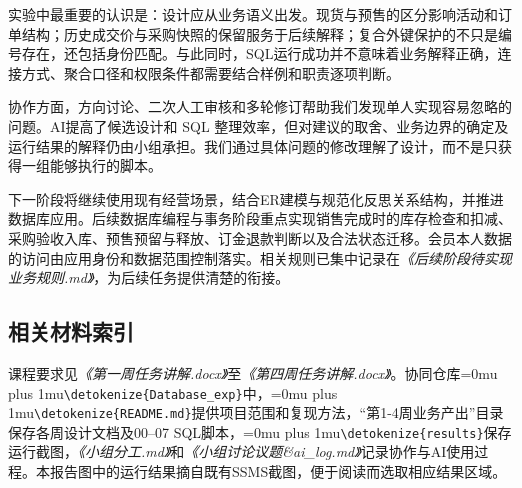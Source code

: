 \documentclass{SYSUReport}
\newcommand{\code}[1]{\begingroup\Urlmuskip=0mu plus 1mu\expandafter\nolinkurl\expandafter{\detokenize{#1}}\endgroup}
\newcommand{\docref}[1]{\textit{《#1》}}
\begin{document}
实验中最重要的认识是：设计应从业务语义出发。现货与预售的区分影响活动和订单结构；历史成交价与采购快照的保留服务于后续解释；复合外键保护的不只是编号存在，还包括身份匹配。与此同时，SQL运行成功并不意味着业务解释正确，连接方式、聚合口径和权限条件都需要结合样例和职责逐项判断。

协作方面，方向讨论、二次人工审核和多轮修订帮助我们发现单人实现容易忽略的问题。AI提高了候选设计和 SQL 整理效率，但对建议的取舍、业务边界的确定及运行结果的解释仍由小组承担。我们通过具体问题的修改理解了设计，而不是只获得一组能够执行的脚本。

下一阶段将继续使用现有经营场景，结合ER建模与规范化反思关系结构，并推进数据库应用。后续数据库编程与事务阶段重点实现销售完成时的库存检查和扣减、采购验收入库、预售预留与释放、订金退款判断以及合法状态迁移。会员本人数据的访问由应用身份和数据范围控制落实。相关规则已集中记录在\docref{后续阶段待实现业务规则.md}，为后续任务提供清楚的衔接。

\subsection*{相关材料索引}
课程要求见\docref{第一周任务讲解.docx}至\docref{第四周任务讲解.docx}。协同仓库\code{Database_exp}中，\code{README.md}提供项目范围和复现方法，“第1-4周业务产出”目录保存各周设计文档及00--07 SQL脚本，\code{results}保存运行截图，\docref{小组分工.md}和\docref{小组讨论议题\&ai\_log.md}记录协作与AI使用过程。本报告图中的运行结果摘自既有SSMS截图，便于阅读而选取相应结果区域。
\end{document}
